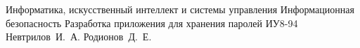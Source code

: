 \documentclass{bmstu}
\begin{document}
\makecourseworktitle
{Информатика, искусственный интеллект и системы управления} %
{Информационная безопасность} %
{Разработка приложения для хранения паролей} %
{ИУ8-94} %
{Невтрилов~И.~А.} %
{Родионов~Д.~Е.} %
{}
{}

\maketableofcontents








\makebibliography


\end{document}
